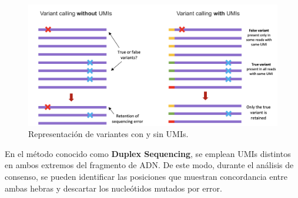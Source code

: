 \begin{figure}[htbp]
\centering
\includegraphics[width = \textwidth]{figs/umi-variants.png}
\caption{Representación de variantes con y sin UMIs.}
\end{figure}

En el método conocido como \textbf{Duplex Sequencing}, se emplean UMIs distintos en ambos extremos del fragmento de ADN. De este modo, durante el análisis de consenso, se pueden identificar las posiciones que muestran concordancia entre ambas hebras y descartar los nucleótidos mutados por error.

